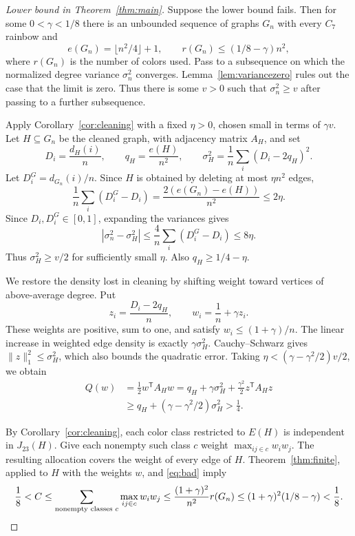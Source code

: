 \documentclass[10pt]{article}
\theoremstyle{remark}
\begin{document}
\begin{proof}[Lower bound in Theorem~\ref{thm:main}]
Suppose the lower bound fails. Then for some $0<\gamma<1/8$ there is an unbounded sequence of graphs $G_n$ with every $C_7$ rainbow and
\begin{equation}\label{eq:bad}
 e(G_n)=\lfloor n^2/4\rfloor+1,\qquad r(G_n)\le(1/8-\gamma)n^2,
\end{equation}
where $r(G_n)$ is the number of colors used. Pass to a subsequence on which the normalized degree variance $\sigma_n^2$ converges. Lemma~\ref{lem:variancezero} rules out the case that the limit is zero. Thus there is some $v>0$ such that $\sigma_n^2\ge v$ after passing to a further subsequence.

Apply Corollary~\ref{cor:cleaning} with a fixed $\eta>0$, chosen small in terms of $\gamma v$. Let $H\subseteq G_n$ be the cleaned graph, with adjacency matrix $A_H$, and set
\[
 D_i=\frac{d_H(i)}n,\qquad q_H=\frac{e(H)}{n^2},\qquad
 \sigma_H^2=\frac1n\sum_i(D_i-2q_H)^2.
\]
Let $D_i^G=d_{G_n}(i)/n$. Since $H$ is obtained by deleting at most $\eta n^2$ edges,
\[
 \frac1n\sum_i(D_i^G-D_i)
 =\frac{2(e(G_n)-e(H))}{n^2}\le2\eta.
\]
Since $D_i,D_i^G\in[0,1]$, expanding the variances gives
\[
 |\sigma_n^2-\sigma_H^2|\le\frac4n\sum_i(D_i^G-D_i)\le8\eta.
\]
Thus $\sigma_H^2\ge v/2$ for sufficiently small $\eta$. Also $q_H\ge1/4-\eta$.

We restore the density lost in cleaning by shifting weight toward vertices of above-average degree. Put
\[
 z_i=\frac{D_i-2q_H}{n},\qquad
 w_i=\frac1n+\gamma z_i.
\]
These weights are positive, sum to one, and satisfy $w_i\le(1+\gamma)/n$. The linear increase in weighted edge density is exactly $\gamma \sigma_H^2$. Cauchy--Schwarz gives $\|z\|_1^2\le \sigma_H^2$, which also bounds the quadratic error. Taking $\eta<(\gamma-\gamma^2/2)v/2$, we obtain
\begin{equation}\label{eq:reweight}
 \begin{aligned}
 Q(w)&=\frac12w^{\mathsf T}A_Hw
 =q_H+\gamma \sigma_H^2+\frac{\gamma^2}{2}z^{\mathsf T}A_Hz\\
 &\ge q_H+(\gamma-\gamma^2/2)\sigma_H^2>\frac14.
 \end{aligned}
\end{equation}

By Corollary~\ref{cor:cleaning}, each color class restricted to $E(H)$ is independent in $J_{23}(H)$. Give each nonempty such class $c$ weight $\max_{ij\in c}w_iw_j$. The resulting allocation covers the weight of every edge of $H$. Theorem~\ref{thm:finite}, applied to $H$ with the weights $w$, and \eqref{eq:bad} imply
\[
 \frac18<C\le\sum_{\text{nonempty classes }c}
       \max_{ij\in c}w_iw_j
 \le\frac{(1+\gamma)^2}{n^2}r(G_n)
 \le(1+\gamma)^2(1/8-\gamma)<\frac18.\qedhere
\]
\end{proof}
\end{document}
